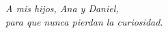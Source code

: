 

\vspace*{3cm} %

\begin{flushright}
	\emph{A mis hijos, Ana y Daniel, \\
		para que nunca pierdan la curiosidad.}
\end{flushright}



